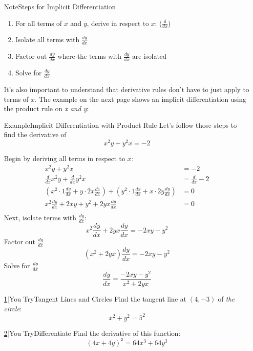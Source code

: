 \documentclass{MathNotes}
\newenvironment{example}[1]
{\begin{BlueBox}{Example}{#1}}{\end{BlueBox}}
\newenvironment{note}[1]
{\begin{YellowBox}{Note}{#1}}{\end{YellowBox}}
\newenvironment{practice}[2]
{\begin{PurpleBox}{\texorpdfstring{#1}\Big|You Try}{#2}}{\end{PurpleBox}}
\begin{document}
\begin{note}{Steps for Implicit Differentiation}
    \begin{enumerate}
        \item For all terms of $x$ and $y$, derive in respect to $x$:
            ($\frac{d}{dx}$) 
        \item Isolate all terms with $\frac{dy}{dx}$
        \item Factor out $\frac{dy}{dx}$ where the terms with $\frac{dy}{dx}$
            are isolated
        \item Solve for $\frac{dy}{dx}$
    \end{enumerate}
\end{note}
It's also important to understand that derivative rules don't have to just
apply to terms of $x$. The example on the next page shows an implicit
differentiation using the product rule on \textit{x and y}:
\begin{example}{Implicit Differentiation with Product Rule}
    Let's follow those steps to find the derivative of $$x^2y+y^2x=-2$$

    Begin by deriving all terms in respect to $x$:
    \begin{align*}
        x^2y+y^2x&=-2\\
        \frac{d}{dx}x^2y+\frac{d}{dx}y^2x&=\frac{d}{dx}-2\\
        (x^2\cdot 1\frac{dy}{dx}+y\cdot2x\frac{dx}{dx})
            +(y^2\cdot1\frac{dx}{dx}+x\cdot2y\frac{dy}{dx})&=0\\
        x^2\frac{dy}{dx}+2xy+y^2+2yx\frac{dy}{dx}&=0\\
    \end{align*}
    Next, isolate terms with $\frac{dy}{dx}$:
    $$x^2\frac{dy}{dx}+2yx\frac{dy}{dx}=-2xy-y^2$$
    Factor out $\frac{dy}{dx}$
    $$(x^2+2yx)\frac{dy}{dx}=-2xy-y^2$$
    Solve for $\frac{dy}{dx}$
    $$\frac{dy}{dx}=\frac{-2xy-y^2}{x^2+2yx}$$
\end{example}

\newpage
\begin{multicols}{2}
    \begin{practice}{\hyperref[ans:2.4-1]{1}}{Tangent Lines and Circles}
        \label{prac:2.4-1}
        Find the tangent line at $(4,-3)$ of \textit{the circle}:
        $$x^2+y^2=5^2$$
    \end{practice}
    \begin{practice}{\hyperref[ans:2.4-2]{2}}{Differentiate}\label{prac:2.4-2}
        Find the derivative of this function: $$(4x+4y)^3=64x^3+64y^3$$
    \end{practice}
\end{multicols}
\end{document}
